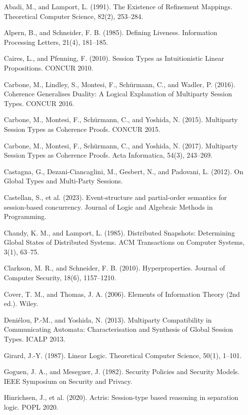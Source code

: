 \documentclass[a4paper,10pt,twocolumn,english]{article}
\numberwithin{equation}{section}
\theoremstyle{paperdef}
\theoremstyle{paperplain}
\theoremstyle{paperdef}
\theoremstyle{paperremark}
\theoremstyle{paperdef}
\newenvironment{citelist}{%
  \begin{list}{}{%
    \setlength{\leftmargin}{1.25em}%
    \setlength{\itemindent}{-1.25em}%
    \setlength{\itemsep}{2pt}%
    \setlength{\parsep}{0pt}%
    \setlength{\topsep}{3pt}}%
}{\end{list}}
\begin{document}
\begin{citelist}
	\item Abadi, M., and Lamport, L. (1991). The Existence of Refinement Mappings. Theoretical Computer Science, 82(2), 253--284.
	\item Alpern, B., and Schneider, F. B. (1985). Defining Liveness. Information Processing Letters, 21(4), 181--185.
	\item Caires, L., and Pfenning, F. (2010). Session Types as Intuitionistic Linear Propositions. CONCUR 2010.
	\item Carbone, M., Lindley, S., Montesi, F., Sch\"urmann, C., and Wadler, P. (2016). Coherence Generalises Duality: A Logical Explanation of Multiparty Session Types. CONCUR 2016.
	\item Carbone, M., Montesi, F., Sch\"urmann, C., and Yoshida, N. (2015). Multiparty Session Types as Coherence Proofs. CONCUR 2015.
	\item Carbone, M., Montesi, F., Sch\"urmann, C., and Yoshida, N. (2017). Multiparty Session Types as Coherence Proofs. Acta Informatica, 54(3), 243--269.
	\item Castagna, G., Dezani-Ciancaglini, M., Gesbert, N., and Padovani, L. (2012). On Global Types and Multi-Party Sessions.
	\item Castellan, S., et al. (2023). Event-structure and partial-order semantics for session-based concurrency. Journal of Logic and Algebraic Methods in Programming.
	\item Chandy, K. M., and Lamport, L. (1985). Distributed Snapshots: Determining Global States of Distributed Systems. ACM Transactions on Computer Systems, 3(1), 63--75.
	\item Clarkson, M. R., and Schneider, F. B. (2010). Hyperproperties. Journal of Computer Security, 18(6), 1157--1210.
	\item Cover, T. M., and Thomas, J. A. (2006). Elements of Information Theory (2nd ed.). Wiley.
	\item Deni\'{e}lou, P.-M., and Yoshida, N. (2013). Multiparty Compatibility in Communicating Automata: Characterisation and Synthesis of Global Session Types. ICALP 2013.
	\item Girard, J.-Y. (1987). Linear Logic. Theoretical Computer Science, 50(1), 1--101.
	\item Goguen, J. A., and Meseguer, J. (1982). Security Policies and Security Models. IEEE Symposium on Security and Privacy.
	\item Hinrichsen, J., et al. (2020). Actris: Session-type based reasoning in separation logic. POPL 2020.

\end{citelist}
\end{document}
